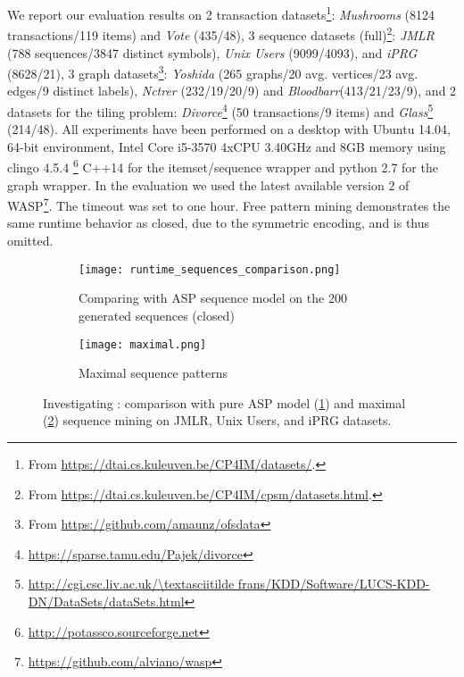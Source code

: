 We report our evaluation results on 2 transaction datasets\!\footnote{From \url{https://dtai.cs.kuleuven.be/CP4IM/datasets/}.}: \textit{Mushrooms} (8124 transactions/119 items) and \textit{Vote} (435/48), 3 sequence datasets (full)\!\footnote{From \url{https://dtai.cs.kuleuven.be/CP4IM/cpsm/datasets.html}.}: \textit{JMLR} (788 sequences/3847 distinct symbols), \textit{Unix Users} (9099/4093), and \textit{iPRG} (8628/21), 3 graph datasets\!\footnote{From \url{https://github.com/amaunz/ofsdata}}: \textit{Yoshida} (265 graphs/20 avg. vertices/23 avg. edges/9 distinct labels), \textit{Nctrer} (232/19/20/9) and \textit{Bloodbarr}(413/21/23/9), and 2 datasets for the tiling problem: \emph{Divorce}\footnote{\url{https://sparse.tamu.edu/Pajek/divorce}}  (50 transactions/9 items) and \emph{Glass}\footnote{{\scriptsize\url{http://cgi.csc.liv.ac.uk/\textasciitilde frans/KDD/Software/LUCS-KDD-DN/DataSets/dataSets.html}}} (214/48).
%
All experiments have been performed on a desktop with Ubuntu 14.04, 64-bit environment, Intel Core i5-3570 4xCPU 3.40GHz and 8GB memory using clingo 4.5.4 \!\footnote{\url{http://potassco.sourceforge.net}} C++14 for the itemset/sequence wrapper and python 2.7 for the graph wrapper. In the evaluation we used %
the latest available version 2 of WASP\footnote{\url{https://github.com/alviano/wasp}}. %
The timeout was set to one hour. Free pattern mining demonstrates the same runtime behavior as closed, due to the symmetric encoding, and is thus omitted. %

\renewcommand{\scalefigures}{0.70}
\begin{figure}[h]
  \centering
  \begin{subfigure}[t]{\textwidth}
  \centering
   \texttt{[image: runtime\_sequences\_comparison.png]}
   \caption{Comparing with ASP sequence model \parencite{DBLP:conf/ijcai/GebserGQ0S16} on the 200 generated sequences (closed)}
    \label{fig:sequence_comparison}
  \end{subfigure}
  \begin{subfigure}[t]{\textwidth}
  \centering
   \texttt{[image: maximal.png]}
   \caption{Maximal sequence patterns} %
    \label{fig:maximal}
  \end{subfigure}
  \caption{Investigating \qone: comparison with pure ASP model (\ref{fig:sequence_comparison}) and maximal (\ref{fig:maximal}) sequence mining on  JMLR, Unix Users, and iPRG datasets.}
  \label{fig:qone_part_one}
\end{figure}

